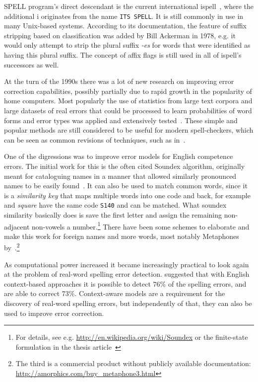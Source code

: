 \documentclass[officiallayout,final]{unihelcompling}
\newcommand\misspelt{\bgroup\markoverwith
{\textcolor{red}{\lower3.5pt\hbox{\sixly \char58}}}\ULon}
\begin{document}
SPELL program's direct descendant is the current international
ispell~\citep{gorin1971spell}, where the additional i originates from the name
\texttt{ITS SPELL}. It is still commonly in use in many Unix-based systems.
According to its documentation, the feature of suffix stripping based on
classification was added by Bill Ackerman in 1978, e.g. it would only attempt
to strip the plural suffix \emph{-es} for words that were identified as having
this plural suffix.  The concept of affix flags is still used in all of
ispell's successors as well.

At the turn of the 1990s there was a lot of new research on improving error
correction capabilities, possibly partially due to rapid growth in the
popularity of home computers. Most popularly the use of statistics from large
text corpora and large datasets of real errors that could be processed to learn
probabilities of word forms and error types was applied and extensively
tested~\citep{kernighan1990spelling,church1991probability}. These simple and
popular methods are still considered to be useful for modern spell-checkers,
which can be seen as common revisions of techniques, such as
in~\citet{brill2000improved}.

One of the digressions was to improve \glspl{error model} for English
competence errors. The initial work for this is the often cited Soundex
algorithm, originally meant for cataloguing names in a manner that allowed
similarly pronounced names to be easily found~\citep{russell1918soundex}. It
can also be used to match common words, since it is a \emph{similarity key}
that maps multiple words into one code and back, for example \misspelt{squer}
and \emph{square} have the same code \texttt{S140} and can be matched.  What
soundex similarity basically does is save the first letter and assign the
remaining non-adjacent non-vowels a number.\footnote{For details, see e.g.
\url{http://en.wikipedia.org/wiki/Soundex} or the finite-state formulation in
the thesis article~} There have been some
schemes to elaborate and make this work for foreign names and more words, most
notably Metaphones
by~\citet{philips1990hanging,philips2000double}.\footnote{The third is a
commercial product without publicly available documentation:
\url{http://amorphics.com/buy_metaphone3.html}}

As computational power increased it became increasingly practical to look again
at the problem of real-word spelling error detection.  \citet{mays1991context}
suggested that with English context-based approaches it is possible to detect
76\% of the spelling errors, and are able to correct 73\%.  Context-aware
models are a requirement for the discovery of real-word spelling errors, but
independently of that, they can also be used to improve error correction. 
\end{document}
